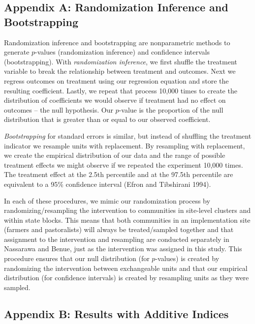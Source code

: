 \documentclass[11pt]{article}
\begin{document}
\hypertarget{appendix-a-randomization-inference-and-bootstrapping}{%
\subsection{Appendix A: Randomization Inference and
Bootstrapping}\label{appendix-a-randomization-inference-and-bootstrapping}}

Randomization inference and bootstrapping are nonparametric methods to
generate \(p\)-values (randomization inference) and confidence intervals
(bootstrapping). With \emph{randomization inference}, we first shuffle
the treatment variable to break the relationship between treatment and
outcomes. Next we regress outcomes on treatment using our regression
equation and store the resulting coefficient. Lastly, we repeat that
process 10,000 times to create the distribution of coefficients we would
observe if treatment had no effect on outcomes -- the null hypothesis.
Our \(p\)-value is the proportion of the null distribution that is
greater than or equal to our observed coefficient.

\emph{Bootstrapping} for standard errors is similar, but instead of
shuffling the treatment indicator we resample units with replacement. By
resampling with replacement, we create the empirical distribution of our
data and the range of possible treatment effects we might observe if we
repeated the experiment 10,000 times. The treatment effect at the 2.5th
percentile and at the 97.5th percentile are equivalent to a 95\%
confidence interval (Efron and Tibshirani 1994).

In each of these procedures, we mimic our randomization process by
randomizing/resampling the intervention to communities in site-level
clusters and within state blocks. This means that both communities in an
implementation site (farmers and pastoralists) will always be
treated/sampled together and that assignment to the intervention and
resampling are conducted separately in Nassarawa and Benue, just as the
intervention was assigned in this study. This procedure ensures that our
null distribution (for \(p\)-values) is created by randomizing the
intervention between exchangeable units and that our empirical
distribution (for confidence intervals) is created by resampling units
as they were sampled.

\hypertarget{appendix-b-results-with-additive-indices}{%
\subsection{Appendix B: Results with Additive
Indices}\label{appendix-b-results-with-additive-indices}}
\end{document}
